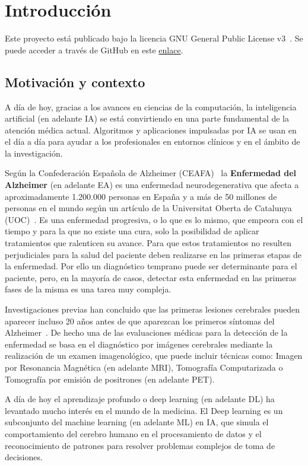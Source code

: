 \chapter{Introducción}\label{ch:introduccion}

Este proyecto está publicado bajo la licencia GNU General Public License v3~\cite{gplv3}.
Se puede acceder a través de GitHub en este \href{https://github.com/raquelmolinare/TFG}{enlace}.


\section{Motivación y contexto}\label{sec:motivacion-y-contexto}
A día de hoy, gracias a los avances en ciencias de la computación, la inteligencia artificial (en adelante \Gls{IA}) se está
convirtiendo en una parte fundamental de la atención médica actual.
Algoritmos y aplicaciones impulsadas por IA se usan en el día a día para ayudar a los profesionales en entornos clínicos
y en el ámbito de la investigación.

Según la Confederación Española de Alzheimer (CEAFA)~\cite{ceafa} la \textbf{Enfermedad del Alzheimer} (en adelante \Gls{EA})
es una enfermedad neurodegenerativa que afecta a aproximadamente 1.200.000 personas en España y a más de 50 millones de
personas en el mundo según un artículo de la Universitat Oberta de Catalunya (UOC)~\cite{uoc}.
Es una enfermedad progresiva, o lo que es lo mismo, que empeora con el tiempo y para la que no existe una cura, solo
la posibilidad de aplicar tratamientos que ralenticen su avance.
Para que estos tratamientos no resulten perjudiciales para la salud del paciente deben realizarse en las primeras etapas
de la enfermedad.
Por ello un diagnóstico temprano puede ser determinante para el paciente, pero, en la mayoría de casos, detectar esta
enfermedad en las primeras fases de la misma es una tarea muy compleja.

Investigaciones previas han concluido que las primeras lesiones cerebrales pueden aparecer incluso 20 años antes de que
aparezcan los primeros síntomas del Alzheimer~\cite{ceafa}.
De hecho una de las evaluaciones médicas para la detección de la enfermedad se basa en el diagnóstico por imágenes
cerebrales mediante la realización de un examen imagenológico, que puede incluir técnicas como: Imagen por Resonancia
Magnética (en adelante MRI), Tomografía Computarizada o Tomografía por emisión de positrones (en adelante \Gls{PET}).

A día de hoy el aprendizaje profundo o deep learning (en adelante \Gls{DL})  ha levantado mucho interés en el mundo de la
medicina.
El Deep learning es un subconjunto del machine learning (en adelante \Gls{ML}) en IA, que simula el comportamiento del cerebro
humano en el procesamiento de datos y el reconocimiento de patrones para resolver problemas complejos de toma de
decisiones.

